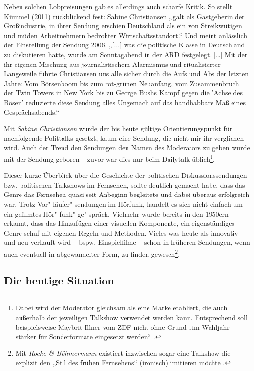 Neben solchen Lobpreisungen gab es allerdings auch scharfe Kritik. So stellt Kümmel (2011) rückblickend fest: Sabine Christiansen „galt als Gastgeberin der Großindustrie, in ihrer Sendung erschien Deutschland als ein von Streikwütigen und müden Arbeitnehmern bedrohter Wirtschaftsstandort.“ Und \textcite{wickSchlussMitStreit2006} meint anlässlich der Einstellung der Sendung 2006, „[$\ldots$] was die politische Klasse in Deutschland zu diskutieren hatte, wurde am Sonntagabend in der ARD festgelegt. [\ldots] Mit der ihr eigenen Mischung aus journalistischem Alarmismus und ritualisierter Langeweile führte Christiansen uns alle sicher durch die Aufs und Abs der letzten Jahre: Vom Börsenboom bis zum rot-grünen Neuanfang, vom Zusammenbruch der Twin Towers in New York bis zu George Bushs Kampf gegen die 'Achse des Bösen' reduzierte diese Sendung alles Ungemach auf das handhabbare Maß eines Gesprächsabends.“

Mit \textit{Sabine Christiansen} wurde der bis heute gültige Orientierungspunkt für nachfolgende Polittalks gesetzt, kaum eine Sendung, die nicht mir ihr verglichen wird. Auch der Trend den Sendungen den Namen des Moderators zu geben wurde mit der Sendung geboren – zuvor war dies nur beim Dailytalk üblich\footnote{Dabei wird der Moderator gleichsam als eine Marke etabliert, die auch außerhalb der jeweiligen Talkshow verwendet werden kann. Entsprechend soll beispielsweise Maybrit Illner vom ZDF nicht ohne Grund „im Wahljahr stärker für Sonderformate eingesetzt werden“ \parencite{o.a.SieversStattIllner2012}.}.

Dieser kurze Überblick über die Geschichte der politischen Diskussionssendungen bzw. politischen Talkshows im Fernsehen, sollte deutlich gemacht habe, dass das Genre das Fernsehen quasi seit Anbeginn begleitete und dabei überaus erfolgreich war. Trotz Vor"-läufer"-sendungen im Hörfunk, handelt es sich nicht einfach um ein gefilmtes Hör"-funk"-ge"-spräch. Vielmehr wurde bereits in den 1950ern erkannt, dass das Hinzufügen einer visuellen Komponente, ein eigenständiges Genre schuf mit eigenen Regeln und Methoden. Vieles was heute als innovativ und neu verkauft wird -- bspw. Einspielfilme -- schon in früheren Sendungen, wenn auch eventuell in abgewandelter Form, zu finden gewesen\footnote{Mit \textit{Roche \& Böhmermann} existiert inzwischen sogar eine Talkshow die explizit den „Stil des frühen Fernsehens“ (ironisch) imitieren möchte \parencite{o.a.RocheBohmermanno.J.}.}.

\subsection{Die heutige Situation}

